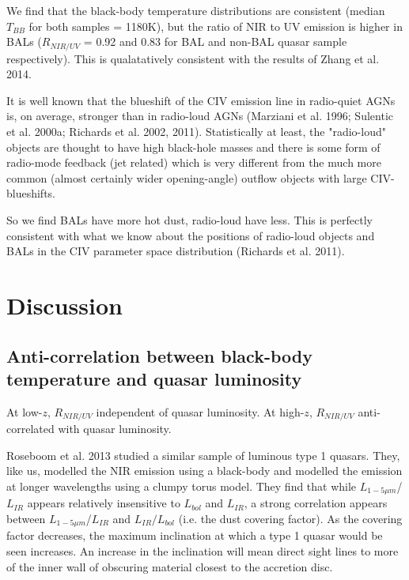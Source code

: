 We find that the black-body temperature distributions are consistent (median $T_{BB}$ for both samples = 1180K), but the ratio of NIR to UV emission is higher in BALs ($R_{NIR/UV}$ = 0.92 and 0.83 for BAL and non-BAL quasar sample respectively). This is qualatatively consistent with the results of Zhang et al. 2014. 

It is well known that the blueshift of the CIV emission line in radio-quiet AGNs is, on average, stronger than in radio-loud AGNs (Marziani et al. 1996; Sulentic et al. 2000a; Richards et al. 2002, 2011). Statistically at least, the "radio-loud" objects are thought to have high black-hole masses and there is some form of radio-mode feedback (jet related) which is very different from the much more common (almost certainly wider opening-angle) outflow objects with large CIV-blueshifts.

So we find BALs have more hot dust, radio-loud have less. 
This is perfectly consistent with what we know about the positions of radio-loud objects and BALs in the CIV parameter space distribution (Richards et al. 2011). 

\section{Discussion}

\subsection{Anti-correlation between black-body temperature and quasar luminosity} 

At low-$z$, $R_{NIR/UV}$ independent of quasar luminosity. 
At high-$z$, $R_{NIR/UV}$ anti-correlated with quasar luminosity. 

Roseboom et al. 2013 studied a similar sample of luminous type 1 quasars. 
They, like us, modelled the NIR emission using a black-body and modelled the emission at longer wavelengths using a clumpy torus model. 
They find that while $L_{1-5\mu m}$/$L_{IR}$ appears relatively insensitive to $L_{bol}$ and $L_{IR}$, a strong correlation appears between $L_{1-5\mu m}$/$L_{IR}$ and $L_{IR}/L_{bol}$ (i.e. the dust covering factor). 
As the covering factor decreases, the maximum inclination at which a type 1 quasar would be seen increases. 
An increase in the inclination will mean direct sight lines to more of the inner wall of obscuring material closest to the accretion disc.

